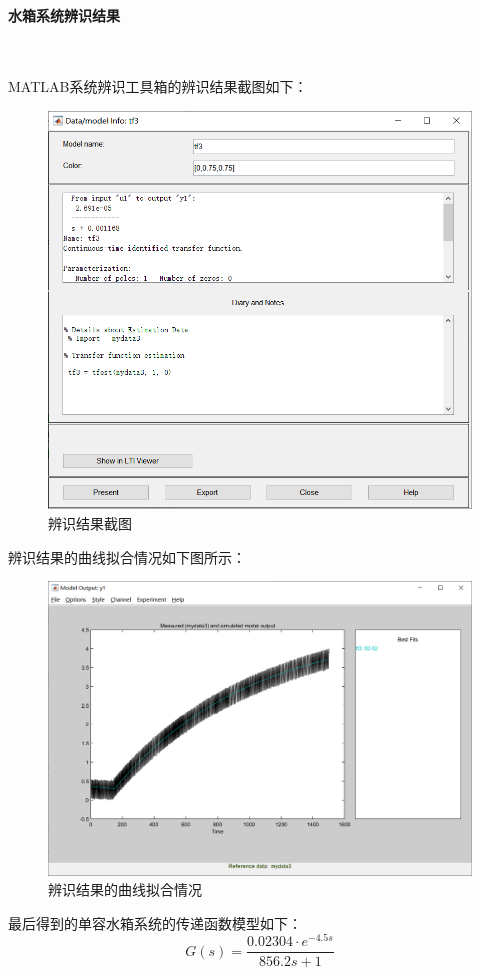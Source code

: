 \documentclass[UTF8]{article}
\begin{document}
\paragraph{水箱系统辨识结果}~{}

MATLAB系统辨识工具箱的辨识结果截图如下：
\begin{figure}[H]
    \centering %
    \includegraphics[width=.6\textwidth]{figure/水箱辨识-传递函数.png} 
    \caption{辨识结果截图} %
\end{figure}

辨识结果的曲线拟合情况如下图所示：
\begin{figure}[H]
    \centering %
    \includegraphics[width=.8\textwidth]{figure/水箱辨识-拟合曲线.png} 
    \caption{辨识结果的曲线拟合情况} %
\end{figure}

最后得到的单容水箱系统的传递函数模型如下：
\begin{equation*}
	G(s) = \frac{0.02304 \cdot e^{-4.5s}}{856.2s + 1}
\end{equation*}
\end{document}
